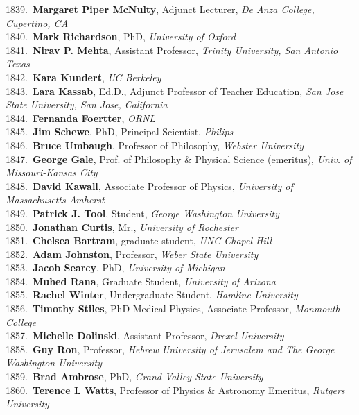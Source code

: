 1839.~{\bf Margaret Piper McNulty}, Adjunct Lecturer, {\sl De Anza College, Cupertino, CA} \\
1840.~{\bf Mark Richardson}, PhD, {\sl University of Oxford} \\
1841.~{\bf Nirav P. Mehta}, Assistant Professor, {\sl Trinity University, San Antonio Texas} \\
1842.~{\bf Kara Kundert}, {\sl UC Berkeley} \\
1843.~{\bf Lara Kassab}, Ed.D., Adjunct Professor of Teacher Education, {\sl San Jose State University, San Jose, California} \\
1844.~{\bf Fernanda Foertter}, {\sl ORNL} \\
1845.~{\bf Jim Schewe}, PhD, Principal Scientist, {\sl Philips } \\
1846.~{\bf Bruce Umbaugh}, Professor of Philosophy, {\sl Webster University } \\
1847.~{\bf George Gale}, Prof. of Philosophy \& Physical Science (emeritus), {\sl Univ. of Missouri-Kansas City} \\
1848.~{\bf David Kawall}, Associate Professor of Physics, {\sl University of Massachusetts Amherst} \\
1849.~{\bf Patrick J. Tool}, Student, {\sl George Washington University} \\
1850.~{\bf Jonathan Curtis}, Mr., {\sl University of Rochester } \\
1851.~{\bf Chelsea Bartram}, graduate student, {\sl UNC Chapel Hill} \\
1852.~{\bf Adam Johnston}, Professor, {\sl Weber State University} \\
1853.~{\bf Jacob Searcy}, PhD, {\sl University of Michigan} \\
1854.~{\bf Muhed Rana}, Graduate Student, {\sl University of Arizona} \\
1855.~{\bf Rachel Winter}, Undergraduate Student, {\sl Hamline University} \\
1856.~{\bf Timothy Stiles}, PhD Medical Physics, Associate Professor, {\sl Monmouth College} \\
1857.~{\bf Michelle Dolinski}, Assistant Professor, {\sl Drexel University} \\
1858.~{\bf Guy Ron}, Professor, {\sl Hebrew University of Jerusalem and The George Washington University} \\
1859.~{\bf Brad Ambrose}, PhD, {\sl Grand Valley State University} \\
1860.~{\bf Terence L Watts}, Professor of Physics \& Astronomy Emeritus, {\sl Rutgers University} \\
